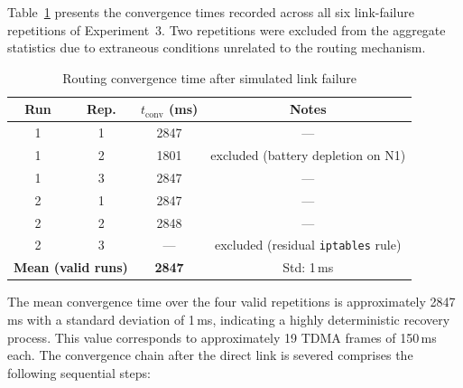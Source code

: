 Table~\ref{tab:convergence} presents the convergence times recorded across
all six link-failure repetitions of Experiment~3. Two repetitions were
excluded from the aggregate statistics due to extraneous conditions
unrelated to the routing mechanism.

\begin{table}[h]
\centering
\caption{Routing convergence time after simulated link failure}
\label{tab:convergence}
\begin{tabular}{cccc}
\toprule
\textbf{Run} & \textbf{Rep.} & \textbf{$t_{\mathrm{conv}}$ (ms)} & \textbf{Notes} \\
\midrule
1 & 1 & 2847 & --- \\
1 & 2 & 1801 & excluded (battery depletion on N1) \\
1 & 3 & 2847 & --- \\
\midrule
2 & 1 & 2847 & --- \\
2 & 2 & 2848 & --- \\
2 & 3 & ---  & excluded (residual \texttt{iptables} rule) \\
\midrule
\multicolumn{2}{l}{\textbf{Mean (valid runs)}} & \textbf{2847} & Std: 1\,ms \\
\bottomrule
\end{tabular}
\end{table}

The mean convergence time over the four valid repetitions is approximately
2847\,ms with a standard deviation of 1\,ms, indicating a highly
deterministic recovery process. This value corresponds to approximately
19 TDMA frames of 150\,ms each. The convergence chain after the direct
link is severed comprises the following sequential steps:

